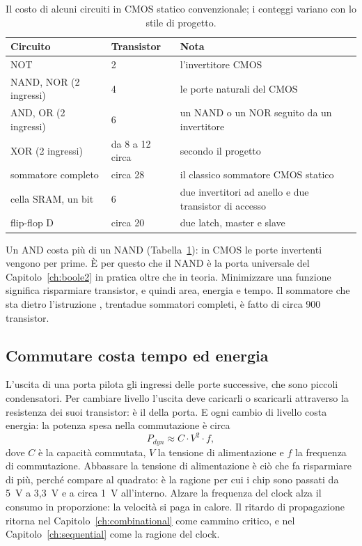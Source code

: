 \begin{table}[htb]
\centering\small
\caption{Il costo di alcuni circuiti in CMOS statico convenzionale; i conteggi
variano con lo stile di progetto.}\label{tab:el:cost}
\begin{tabular}{@{}lll@{}}
\toprule
\textbf{Circuito} & \textbf{Transistor} & \textbf{Nota}\\
\midrule
NOT & 2 & l'invertitore CMOS\\
NAND, NOR (2 ingressi) & 4 & le porte naturali del CMOS\\
AND, OR (2 ingressi) & 6 & un NAND o un NOR seguito da un invertitore\\
XOR (2 ingressi) & da 8 a 12 circa & secondo il progetto\\
sommatore completo & circa 28 & il classico sommatore CMOS statico\\
cella SRAM, un bit & 6 & due invertitori ad anello e due transistor di accesso\\
flip-flop D & circa 20 & due latch, master e slave\\
\bottomrule
\end{tabular}
\end{table}

Un AND costa più di un NAND (Tabella~\ref{tab:el:cost}): in CMOS le porte
invertenti vengono per prime. È per questo che il NAND è la porta universale
del Capitolo~\ref{ch:boole2} in pratica oltre che in teoria. Minimizzare una
funzione significa risparmiare transistor, e quindi area, energia e tempo. Il
sommatore che sta dietro l'istruzione , trentadue sommatori completi,
è fatto di circa 900 transistor.

\subsection{Commutare costa tempo ed energia}

L'uscita di una porta pilota gli ingressi delle porte successive, che sono
piccoli condensatori. Per cambiare livello l'uscita deve caricarli o
scaricarli attraverso la resistenza dei suoi transistor: è il  della porta. E ogni cambio di livello costa energia: la potenza
spesa nella commutazione è circa
\[ P_{dyn} \approx C\cdot V^{2}\cdot f, \]
dove $C$ è la capacità commutata, $V$ la tensione di alimentazione e $f$ la
frequenza di commutazione. Abbassare la tensione di alimentazione è ciò che fa
risparmiare di più, perché compare al quadrato: è la ragione per cui i chip
sono passati da 5~V a 3,3~V e a circa 1~V all'interno. Alzare la frequenza del
clock alza il consumo in proporzione: la velocità si paga in calore. Il ritardo
di propagazione ritorna nel Capitolo~\ref{ch:combinational} come cammino
critico, e nel Capitolo~\ref{ch:sequential} come la ragione del clock.

